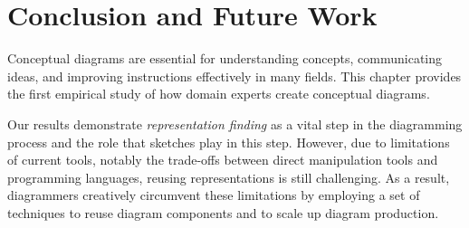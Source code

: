 

\section{Conclusion and Future Work}

Conceptual diagrams are essential for understanding concepts, communicating ideas, and improving instructions effectively in many fields. This chapter provides the first empirical study of how domain experts create conceptual diagrams.

Our results demonstrate \emph{representation finding} as a vital step in the diagramming process and the role that sketches play in this step. However, due to limitations of current tools, notably the trade-offs between direct manipulation tools and programming languages, reusing representations is still challenging. As a result, diagrammers creatively circumvent these limitations by employing a set of  techniques to reuse diagram components and to scale up diagram production. 


